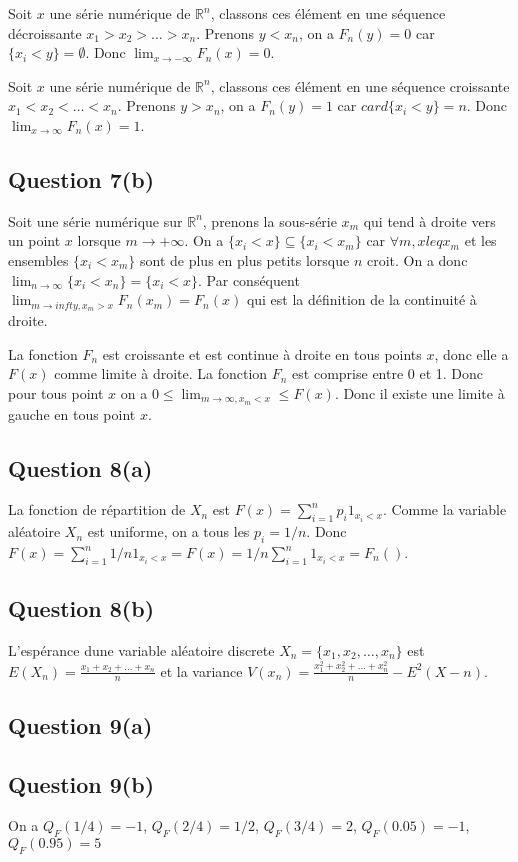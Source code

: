 \documentclass[]{book}
\theoremstyle{definition}
\newcommand{\bb}[1]{\mathbb{#1}}
\newcommand{\R}{\bb{R}}
\begin{document}
Soit $x$ une s\'erie num\'erique de $\R^n$, classons ces \'el\'ement en une s\'equence d\'ecroissante $x_1 > x_2 > \ldots > x_n$. Prenons $y < x_n$, on a $F_n(y) = 0$ car $\{ x_i < y \} = \emptyset$. Donc $\lim_{x \to -\infty}F_n(x) = 0$.

Soit $x$ une s\'erie num\'erique de $\R^n$, classons ces \'el\'ement en une s\'equence croissante $x_1 < x_2 < \ldots < x_n$. Prenons $y > x_n$, on a $F_n(y) = 1$ car $card \{ x_i < y \} = n$. Donc $\lim_{x \to \infty}F_n(x) = 1$.

\subsection*{Question 7(b)}
Soit une s\'erie num\'erique sur $\R^n$, prenons la sous-s\'erie $x_m$ qui tend \`a droite vers un point $x$ lorsque $m \to +\infty$. On a $\{ x_i < x\} \subseteq \{x_i < x_m\}$ car $\forall m, x leq x_m$ et les ensembles $\{x_i < x_m\}$ sont de plus en plus petits lorsque $n$ croit. On a donc $\lim_{n \to \infty} \{ x_i < x_n\} = \{x_i < x\}$. Par cons\'equent $\lim_{m \to infty, x_m > x} F_n(x_m) = F_n(x)$ qui est la d\'efinition de la continuit\'e \`a droite.

La fonction $F_n$ est croissante et est continue \`a droite en tous points $x$, donc elle a $F(x)$ comme limite \`a droite. La fonction $F_n$ est comprise entre 0 et 1. Donc pour tous point $x$ on a $0 \leq \lim_{m \to \infty, x_m < x} \leq F(x)$.  Donc il existe une limite \`a gauche en tous point $x$.

\subsection*{Question 8(a)}
La fonction de r\'epartition de $X_n$ est $F(x) = \sum_{i=1}^{n} p_i 1_{x_i < x}$. Comme la variable al\'eatoire $X_n$ est uniforme, on a tous les $p_i = 1/n$. Donc $F(x) = \sum_{i=1}^{n} 1/n 1_{x_i < x} = F(x) = 1/n \sum_{i=1}^{n} 1_{x_i < x} = F_n()$.

\subsection*{Question 8(b)}
L'esp\'erance dune variable al\'eatoire discrete $X_n = \{x_1, x_2, \ldots, x_n\}$ est $E(X_n) = \frac{x_1+x_2+\ldots + x_n}{n}$ et la variance $V(x_n) = \frac{x_1^2+x_2^2+\ldots + x_n^2}{n} - E^2(X-n)$.

\subsection*{Question 9(a)}

\subsection*{Question 9(b)}
On a $Q_F(1/4) = -1$, $Q_F(2/4) = 1/2$, $Q_F(3/4) = 2$, $Q_F(0.05) = -1$, $Q_F(0.95) = 5$ 
\end{document}
